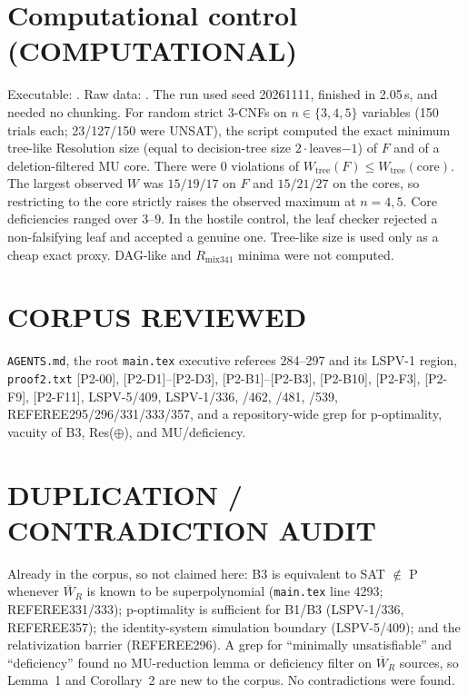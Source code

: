\documentclass[11pt]{article}
\begin{document}
\section{Computational control (COMPUTATIONAL)}
Executable: . Raw data:
.
The run used seed 20261111, finished in 2.05\,s, and needed no chunking.
For random strict 3-CNFs on $n\in\{3,4,5\}$ variables (150 trials each; 23/127/150 were UNSAT),
the script computed the exact minimum tree-like Resolution size (equal to decision-tree size $2\cdot$leaves$-1$) of $F$ and of a deletion-filtered MU core.
There were 0 violations of $W_{\mathrm{tree}}(F)\le W_{\mathrm{tree}}(\mathrm{core})$.
The largest observed $W$ was $15/19/17$ on $F$ and $15/21/27$ on the cores, so restricting to the core strictly raises the observed maximum at $n=4,5$.
Core deficiencies ranged over $3$--$9$.
In the hostile control, the leaf checker rejected a non-falsifying leaf and accepted a genuine one.
Tree-like size is used only as a cheap exact proxy. DAG-like and $R_{\mathrm{mix341}}$ minima were not computed.

\section*{CORPUS REVIEWED}
\texttt{AGENTS.md}, the root \texttt{main.tex} executive referees 284--297 and its LSPV-1 region,
\texttt{proof2.txt} [P2-00], [P2-D1]--[P2-D3], [P2-B1]--[P2-B3], [P2-B10], [P2-F3], [P2-F9], [P2-F11],
LSPV-5/409, LSPV-1/336, /462, /481, /539, REFEREE295/296/331/333/357, and a repository-wide grep for
p-optimality, vacuity of B3, Res($\oplus$), and MU/deficiency.

\section*{DUPLICATION / CONTRADICTION AUDIT}
Already in the corpus, so not claimed here: B3 is equivalent to SAT $\notin$ P whenever $\overline W_R$ is known to be superpolynomial (\texttt{main.tex} line 4293; REFEREE331/333);
p-optimality is sufficient for B1/B3 (LSPV-1/336, REFEREE357); the identity-system simulation boundary (LSPV-5/409); and the relativization barrier (REFEREE296).
A grep for ``minimally unsatisfiable'' and ``deficiency'' found no MU-reduction lemma or deficiency filter on $\overline W_R$ sources, so Lemma~1 and Corollary~2 are new to the corpus.
No contradictions were found.
\end{document}
